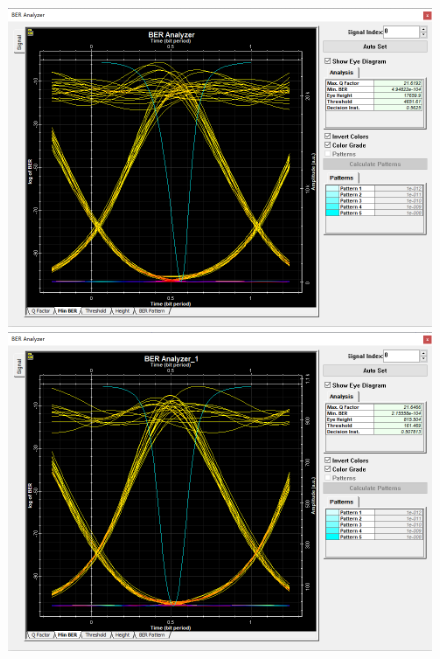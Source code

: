\documentclass[12pt]{article}
\begin{document}
\begin{figure}[H]
    \begin{minipage}[t]{0.5\linewidth}
        \centering
        \includegraphics[scale=0.2]{sweep2BER1.png}
        \caption{}
        \label{fig:side:a}
      \end{minipage}%
      \begin{minipage}[t]{0.5\linewidth}
        \centering
        \includegraphics[scale=0.2]{sweep2BER2.png}
        \caption{}
        \label{fig:side:b}
      \end{minipage}
	  \begin{minipage}[t]{0.5\linewidth}
        \centering

\end{minipage}
\end{figure}
\end{document}
